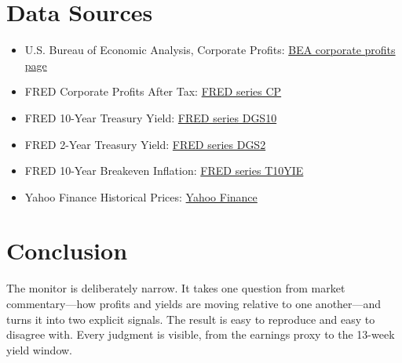 \documentclass[11pt]{article}
\begin{document}
\section{Data Sources}

\begin{itemize}
  \item U.S. Bureau of Economic Analysis, Corporate Profits:
  \href{https://www.bea.gov/data/income-saving/corporate-profits}{BEA corporate profits page}
  \item FRED Corporate Profits After Tax:
  \href{https://fred.stlouisfed.org/series/CP}{FRED series CP}
  \item FRED 10-Year Treasury Yield:
  \href{https://fred.stlouisfed.org/series/DGS10}{FRED series DGS10}
  \item FRED 2-Year Treasury Yield:
  \href{https://fred.stlouisfed.org/series/DGS2}{FRED series DGS2}
  \item FRED 10-Year Breakeven Inflation:
  \href{https://fred.stlouisfed.org/series/T10YIE}{FRED series T10YIE}
  \item Yahoo Finance Historical Prices:
  \href{https://finance.yahoo.com/}{Yahoo Finance}
\end{itemize}

\section{Conclusion}

The monitor is deliberately narrow. It takes one question from market
commentary---how profits and yields are moving relative to one another---and
turns it into two explicit signals. The result is easy to reproduce and easy
to disagree with. Every judgment is visible, from the earnings proxy to the
13-week yield window.

\vfill
\begin{center}
\end{center}
\end{document}
